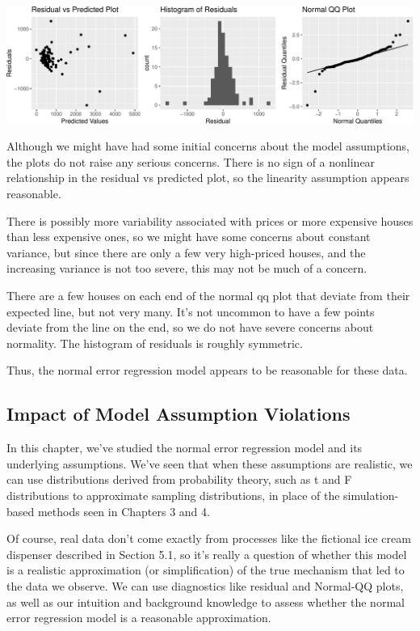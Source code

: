 \documentclass[
  letterpaper,
  DIV=11,
  numbers=noendperiod]{scrreprt}
\begin{document}
\includegraphics{Ch5_files/figure-pdf/unnamed-chunk-11-1.pdf}

Although we might have had some initial concerns about the model
assumptions, the plots do not raise any serious concerns. There is no
sign of a nonlinear relationship in the residual vs predicted plot, so
the linearity assumption appears reasonable.

There is possibly more variability associated with prices or more
expensive houses than less expensive ones, so we might have some
concerns about constant variance, but since there are only a few very
high-priced houses, and the increasing variance is not too severe, this
may not be much of a concern.

There are a few houses on each end of the normal qq plot that deviate
from their expected line, but not very many. It's not uncommon to have a
few points deviate from the line on the end, so we do not have severe
concerns about normality. The histogram of residuals is roughly
symmetric.

Thus, the normal error regression model appears to be reasonable for
these data.

\subsection{Impact of Model Assumption
Violations}\label{impact-of-model-assumption-violations}

In this chapter, we've studied the normal error regression model and its
underlying assumptions. We've seen that when these assumptions are
realistic, we can use distributions derived from probability theory,
such as t and F distributions to approximate sampling distributions, in
place of the simulation-based methods seen in Chapters 3 and 4.

Of course, real data don't come exactly from processes like the
fictional ice cream dispenser described in Section 5.1, so it's really a
question of whether this model is a realistic approximation (or
simplification) of the true mechanism that led to the data we observe.
We can use diagnostics like residual and Normal-QQ plots, as well as our
intuition and background knowledge to assess whether the normal error
regression model is a reasonable approximation.
\end{document}
